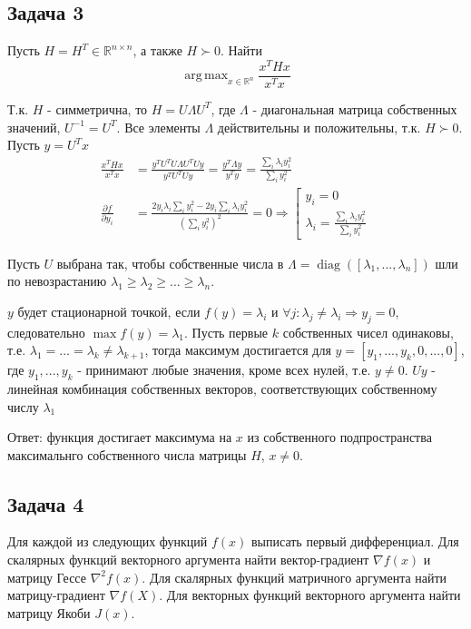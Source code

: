 \documentclass{article}
\DeclareMathOperator*{\argmax}{arg\,max}
\DeclareMathOperator{\diag}{diag}
\begin{document}
    
    \subsection*{Задача 3}
    
    Пусть $H = H^T \in \mathbb{R}^{n \times n}$, а также $H \succ 0$. Найти
    \begin{equation*}
         \argmax_{x \in \mathbb{R}^n} \frac{x^T Hx}{x^T x}
    \end{equation*}
    
    Т.к. $H$ - симметрична, то $H = U\Lambda U^T$, где $\Lambda$ - диагональная матрица собственных значений, $U^{-1} = U^T$. Все элементы $\Lambda$ действительны и положительны, т.к. $H \succ 0$. Пусть $y = U^Tx$
    \begin{align*}
         \frac{x^T Hx}{x^T x} &= \frac{y^TU^T U\Lambda U^TUy}{y^TU^TUy} = \frac{y^T\Lambda y}{y^Ty} = \frac{\sum_i \lambda_i y_i^2}{\sum_i y_i^2}\\
         \frac{\partial f}{\partial y_i} &= \frac{2y_i\lambda_i\sum_i y_i^2 - 2y_i\sum_i \lambda_i y_i^2}{(\sum_i y_i^2)^2} = 0 \Rightarrow 
         \left[ 
            \begin{gathered}
                y_i = 0 \\ 
                \lambda_i = \frac{\sum_i \lambda_i y_i^2}{\sum_i y_i^2}
            \end{gathered} 
        \right.
    \end{align*}
    
    
    
    Пусть $U$ выбрана так, чтобы собственные числа в $\Lambda = \diag([\lambda_1, ..., \lambda_n])$ шли по невозрастанию $\lambda_1 \geq \lambda_2 \geq ... \geq \lambda_n$. 
    
    $y$ будет стационарной точкой, если $f(y) = \lambda_i$ и $\forall j: \lambda_j \neq \lambda_i \Rightarrow y_j = 0$, следовательно $\max f(y) = \lambda_1$. Пусть первые $k$ собственных чисел одинаковы, т.е. $\lambda_1 = ... = \lambda_k \neq \lambda_{k+1}$, тогда максимум достигается для $y = [y_1, ..., y_k, 0, ..., 0]$, где $y_1, ..., y_k$ - принимают любые значения, кроме всех нулей, т.е. $y \neq 0$. $Uy$ - линейная комбинация собственных векторов, соответствующих собственному числу $\lambda_1$ 
    
    Ответ: функция достигает максимума на $x$ из собственного подпространства максимальнго собственного числа матрицы $H$, $x \neq 0$.
    \newpage
    
    \subsection*{Задача 4}
    Для каждой из следующих функций $f(x)$ выписать первый дифференциал. Для
 скалярных функций векторного аргумента найти вектор-градиент $\nabla f(x)$ и матрицу Гессе $\nabla^2 f(x)$.
 Для скалярных функций матричного аргумента найти матрицу-градиент $\nabla f(X)$. Для векторных
 функций векторного аргумента найти матрицу Якоби $J(x)$.
    
\end{document}
